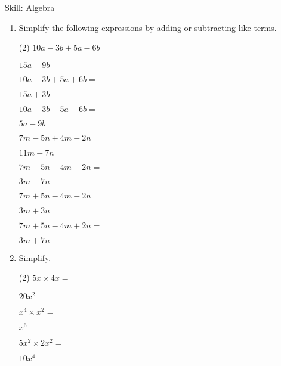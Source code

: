 \begin{bxTip}[colbacktitle=bkcolor]{Skill: Algebra}
\begin{enumerate} [leftmargin=0cm]
	
\item Simplify the following expressions by adding or subtracting like terms.
\begin{tasks}[label=(\alph*), after-item-skip=2pt,after-skip=3pt, label-width=4ex](2)
    \task  $ 10a-3b+5a-6b=    $                              \begin{envFillIn} $  15a-9b         $ \end{envFillIn}
    \task  $ 10a-3b+5a+6b=    $                              \begin{envFillIn} $  15a+3b         $ \end{envFillIn}
    \task  $ 10a-3b-5a-6b=    $                              \begin{envFillIn} $  5a-9b          $ \end{envFillIn}
    \task  $ 7m-5n+4m-2n=     $                              \begin{envFillIn} $  11m-7n         $ \end{envFillIn}
    \task  $ 7m-5n-4m-2n=     $                              \begin{envFillIn} $  3m-7n          $ \end{envFillIn}
    \task  $ 7m+5n-4m-2n=     $                              \begin{envFillIn} $  3m+3n          $ \end{envFillIn}
    \task  $ 7m+5n-4m+2n=     $                              \begin{envFillIn} $  3m+7n          $ \end{envFillIn}
  
\end{tasks}


\item Simplify.
\begin{tasks}[label=(\alph*), after-item-skip=2pt,after-skip=3pt, label-width=4ex](2)
    \task  $ 5x  \times 4x =                                  $            \begin{envFillIn} $  20x^2         $ \end{envFillIn}
    \task  $ x^4 \times x^2=                                  $            \begin{envFillIn} $  x^6           $ \end{envFillIn}
    \task  $ 5x^2 \times 2x^2=                                $            \begin{envFillIn} $  10x^4         $ \end{envFillIn}
  
\end{tasks}



\end{enumerate}
\end{bxTip}
